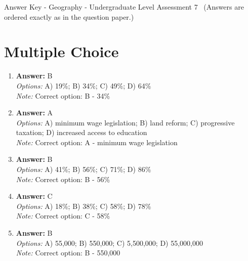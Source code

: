 \documentclass[12pt]{article}
\begin{document}
\begin{center}
Answer Key - Geography - Undergraduate Level Assessment 7 \
\small (Answers are ordered exactly as in the question paper.)
\end{center}

\section*{Multiple Choice}
\begin{enumerate}[label=\arabic*.]
\item \textbf{Answer:} B
\\ \textit{Options:} A) 19\%; B) 34\%; C) 49\%; D) 64\%
\\ \textit{Note:} Correct option: B - 34\%
\item \textbf{Answer:} A
\\ \textit{Options:} A) minimum wage legislation; B) land reform; C) progressive taxation; D) increased access to education
\\ \textit{Note:} Correct option: A - minimum wage legislation
\item \textbf{Answer:} B
\\ \textit{Options:} A) 41\%; B) 56\%; C) 71\%; D) 86\%
\\ \textit{Note:} Correct option: B - 56\%
\item \textbf{Answer:} C
\\ \textit{Options:} A) 18\%; B) 38\%; C) 58\%; D) 78\%
\\ \textit{Note:} Correct option: C - 58\%
\item \textbf{Answer:} B
\\ \textit{Options:} A) 55,000; B) 550,000; C) 5,500,000; D) 55,000,000
\\ \textit{Note:} Correct option: B - 550,000
\end{enumerate}
\end{document}
